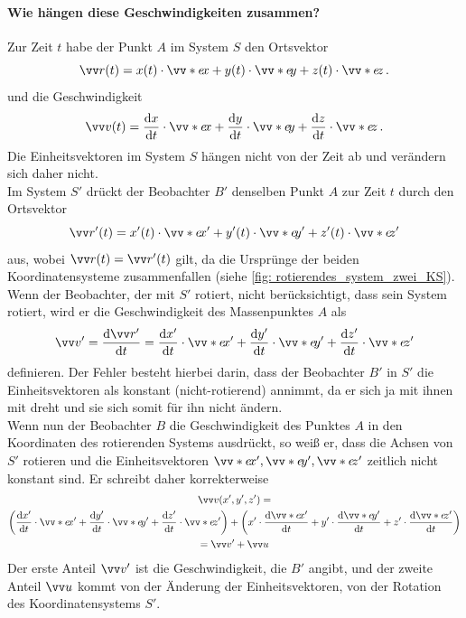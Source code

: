 \paragraph{Wie hängen diese Geschwindigkeiten zusammen?}
Zur Zeit $t$ habe der Punkt $A$ im System $S$ den Ortsvektor 
\begin{equation}
    \ivec{r}(t) = x(t)\cdot \ivecS{e}{x} + y(t)\cdot \ivecS{e}{y} + z(t)\cdot \ivecS{e}{z} \mDot
\end{equation}
und die Geschwindigkeit 
\begin{equation}\label{eq: geschwindigkeit_v_in_S}
    \ivec{v}(t) = \frac{\dd x}{\dd t} \cdot \ivecS{e}{x} + \frac{\dd y}{\dd t}\cdot \ivecS{e}{y} + \frac{\dd z}{\dd t}\cdot \ivecS{e}{z} \mDot
\end{equation}
Die Einheitsvektoren im System $S$ hängen nicht von der Zeit ab und verändern sich daher nicht. \\
Im System $S'$ drückt der Beobachter $B'$ denselben Punkt $A$ zur Zeit $t$ durch den Ortsvektor 
\begin{equation}
    \ivec{r}'(t) = x'(t)\cdot \ivecS{e}{x}' + y'(t)\cdot \ivecS{e}{y}' + z'(t)\cdot \ivecS{e}{z}'
\end{equation}
aus, wobei $\ivec{r}(t) = \ivec{r}'(t)$ gilt, da die Ursprünge der beiden Koordinatensysteme zusammenfallen (siehe \cref{fig: rotierendes_system_zwei_KS}). Wenn der Beobachter, der mit $S'$ rotiert, nicht berücksichtigt, dass sein System rotiert, wird er die Geschwindigkeit des Massenpunktes $A$ als 
\begin{equation}\label{eq: geschw_vD_herleitung_coriolis}
    \ivec{v}' = \frac{\dd \ivec{r}'}{\dd t} = \frac{\dd x'}{\dd t}\cdot \ivecS{e}{x}' + \frac{\dd y'}{\dd t}\cdot \ivecS{e}{y}' + \frac{\dd z'}{\dd t}\cdot \ivecS{e}{z}' 
\end{equation}
definieren. Der Fehler besteht hierbei darin, dass der Beobachter $B'$ in $S'$ die Einheitsvektoren als konstant (nicht-rotierend) annimmt, da er sich ja mit ihnen mit dreht und sie sich somit für ihn nicht ändern. \\

Wenn nun der Beobachter $B$ die Geschwindigkeit des Punktes $A$ in den Koordinaten des rotierenden Systems ausdrückt, so weiß er, dass die Achsen von $S'$ rotieren und die Einheitsvektoren $\ivecS{e}{x}',\ivecS{e}{y}',\ivecS{e}{z}'$ zeitlich nicht konstant sind. Er schreibt daher korrekterweise
\begin{multline}\label{eq: transformation_v_vS_u}
    \ivec{v}(x',y',z') = \\
    \left( \frac{\dd x'}{\dd t} \cdot \ivecS{e}{x}' + \frac{\dd y'}{\dd t} \cdot \ivecS{e}{y}' + \frac{\dd z'}{\dd t} \cdot \ivecS{e}{z}'\right)  +  \left( x'\cdot \frac{\dd \ivecS{e}{x}'}{\dd t} + y'\cdot \frac{\dd \ivecS{e}{y}'}{\dd t} + z'\cdot \frac{\dd \ivecS{e}{z}'}{\dd t} \right) \\
    = \ivec{v}' + \ivec{u}
\end{multline}
Der erste Anteil $\ivec{v}'$ ist die Geschwindigkeit, die $B'$ angibt, und der zweite Anteil $\ivec{u}$ kommt von der Änderung der Einheitsvektoren, \gDh von der Rotation des Koordinatensystems $S'$. \\

